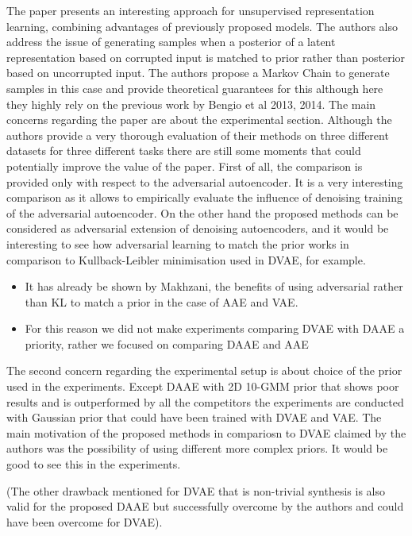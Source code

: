 \documentclass{article}
\begin{document}
The paper presents an interesting approach for unsupervised representation learning, combining advantages of previously proposed models. The authors also address the issue of generating samples when a posterior of a latent representation based on corrupted input is matched to prior rather than posterior based on uncorrupted input. The authors propose a Markov Chain to generate samples in this case and provide theoretical guarantees for this although here they highly rely on the previous work by Bengio et al 2013, 2014. 
{\color{blue}
The main concerns regarding the paper are about the experimental section. Although the authors provide a very thorough evaluation of their methods on three different datasets for three different tasks there are still some moments that could potentially improve the value of the paper. First of all, the comparison is provided only with respect to the adversarial autoencoder. It is a very interesting comparison as it allows to empirically evaluate the influence of denoising training of the adversarial autoencoder. On the other hand the proposed methods can be considered as adversarial extension of denoising autoencoders, and it would be interesting to see how adversarial learning to match the prior works in comparison to Kullback-Leibler minimisation used in DVAE, for example.}

\begin{itemize}
    \item It has already be shown by Makhzani, the benefits of using adversarial rather than KL to match a prior in the case of AAE and VAE.
    \item For this reason we did not make experiments comparing DVAE with DAAE a priority, rather we focused on comparing DAAE and AAE
\end{itemize}

{\color{blue}
The second concern regarding the experimental setup is about choice of the prior used in the experiments. Except DAAE with 2D 10-GMM prior that shows poor results and is outperformed by all the competitors the experiments are conducted with Gaussian prior that could have been trained with DVAE and VAE. The main motivation of the proposed methods in compariosn to DVAE claimed by the authors was the possibility of using different more complex priors. It would be good to see this in the experiments.}\newline 


{\color{blue}(The other drawback mentioned for DVAE that is non-trivial synthesis is also valid for the proposed DAAE but successfully overcome by the authors and could have been overcome for DVAE)}. \newline
\end{document}
